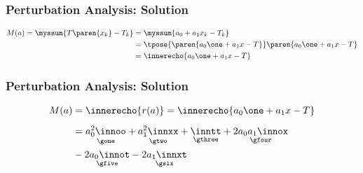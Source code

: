 %
\begin{frame}\frametitle{Perturbation Analysis: Solution}
\begin{equation}
	\begin{split}
		M(a)
			 = \myssum{ T\paren{x_{k}} - T_{k} } 
			&= \myssum{ a_{0} + a_{1} x_{k} - T_{k} } \\
			&= \tpose{\paren{a_{0} \one + a_{1}x -T}} \paren{a_{0} \one + a_{1}x -T} \\
			&= \innerecho{a_{0} \one + a_{1}x -T}
	\end{split}
\label{eq:perturb difference}
\end{equation}
\end{frame}
%
%
\begin{frame}\frametitle{Perturbation Analysis: Solution}
\begin{equation}
	\begin{split}
	M(a)
		& = \innerecho{r(a)} = \innerecho{a_{0} \one + a_{1}x -T}  \\[5pt]
		& = \underset{\gone}{a_{0}^{2} \innoo}
			+ \underset{\gtwo}{a_{1}^{2} \innxx}
			+ \underset{\gthree}{\inntt}
			+ \underset{\gfour}{2 a_{0}a_{1} \innox} \\
		&	- \underset{\gfive}{2a_{0}\innot}
			- \underset{\gsix}{2a_{1}\innxt} \\
	\end{split}
\end{equation}
\end{frame}
%
%

